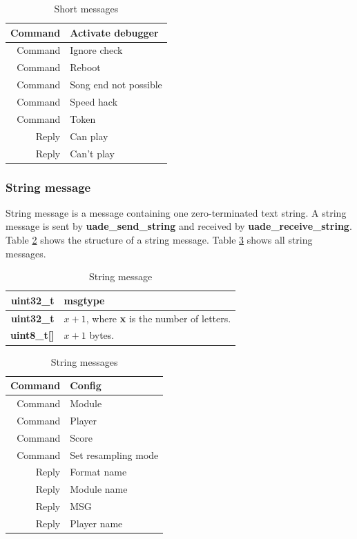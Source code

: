 \documentclass{article}
\begin{document}
\begin{table}
\begin{center}
\caption{Short messages}
\label{tab:short_messages}
\begin{tabular}{|r|l|}
\hline
Command & Activate debugger\\
\hline
Command & Ignore check\\
\hline
Command & Reboot \\
\hline
Command & Song end not possible \\
\hline
Command & Speed hack \\
\hline
Command & Token \\
\hline
Reply & Can play\\
\hline
Reply & Can't play\\
\hline
\end{tabular}
\end{center}
\end{table}

\subsubsection{String message}

String message is a message containing one zero-terminated text string.
A string message is sent by \textbf{uade\_send\_string} and received by
\textbf{uade\_receive\_string}. Table \ref{tab:string_message} shows
the structure of a string message. Table \ref{tab:string_messages} shows
all string messages.

\begin{table}
\begin{center}
\caption{String message}
\label{tab:string_message}
\begin{tabular}{|r|l|}
\hline
\textbf{uint32\_t} & msgtype\\
\hline
\textbf{uint32\_t} & $x + 1$, where \textbf{x} is the number of letters.\\
\hline
\textbf{uint8\_t[]} & $x + 1$ bytes.\\
\hline
\end{tabular}
\end{center}
\end{table}

\begin{table}
\begin{center}
\caption{String messages}
\label{tab:string_messages}
\begin{tabular}{|r|l|}
\hline
Command & Config\\
\hline
Command & Module\\
\hline
Command & Player\\
\hline
Command & Score\\
\hline
Command & Set resampling mode\\
\hline
Reply & Format name\\
\hline
Reply & Module name\\
\hline
Reply & MSG\\
\hline
Reply & Player name\\
\hline
\end{tabular}
\end{center}
\end{table}
\end{document}
